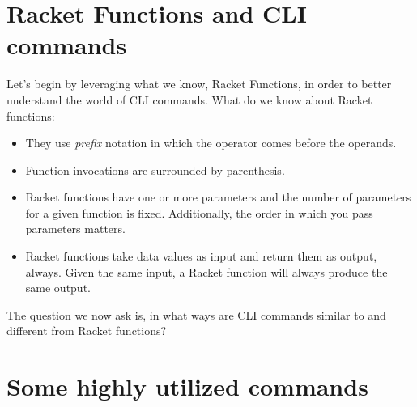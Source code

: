 \documentclass[]{tufte-handout}
\begin{document}
 
\section{Racket Functions and CLI commands}

Let's begin by leveraging what we know, Racket Functions, in order to better understand the world of CLI commands.  What do we know about Racket functions:
\begin{itemize}
\item They use \textit{prefix} notation in which the operator comes before the operands. 
\item Function invocations are surrounded by parenthesis. 
\item Racket functions have one or more parameters and the number of parameters for a given function is fixed.  Additionally, the order in which you pass parameters matters. 
\item Racket functions take data values as input and return them as output, always. Given the same input, a Racket function will always produce the same output.
\end{itemize}
The question we now ask is, in what ways are CLI commands similar to and different from Racket functions?

\section{Some highly utilized commands}
\end{document}
